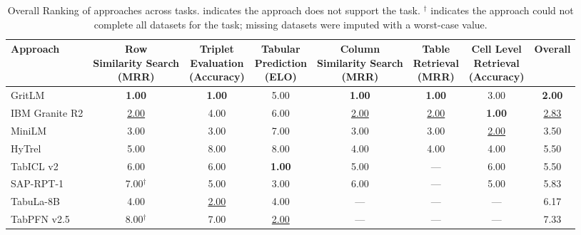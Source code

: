 \begin{table}[t]
\centering
\begin{tabular*}{\textwidth}{lccccccc}
\hline
Approach & \makecell{Row \\ Similarity Search \\ (MRR)} & \makecell{Triplet \\ Evaluation \\ (Accuracy) } & \makecell{Tabular \\ Prediction\\ (ELO)} & \makecell{Column \\ Similarity Search \\ (MRR)} & \makecell{Table \\ Retrieval \\ (MRR)} & \makecell{Cell Level\\ Retrieval \\ (Accuracy)} & Overall \\
\hline
GritLM & \textbf{1.00} & \textbf{1.00} & 5.00 & \textbf{1.00} & \textbf{1.00} & 3.00 & \textbf{2.00} \\
IBM Granite R2 & \underline{2.00} & 4.00 & 6.00 & \underline{2.00} & \underline{2.00} & \textbf{1.00} & \underline{2.83} \\
MiniLM & 3.00 & 3.00 & 7.00 & 3.00 & 3.00 & \underline{2.00} & 3.50 \\
HyTrel & 5.00 & 8.00 & 8.00 & 4.00 & 4.00 & 4.00 & 5.50 \\
TabICL v2 & 6.00 & 6.00 & \textbf{1.00} & 5.00 & --- & 6.00 & 5.50 \\
SAP-RPT-1 & 7.00$^\dagger$ & 5.00 & 3.00 & 6.00 & --- & 5.00 & 5.83 \\
TabuLa-8B & 4.00 & \underline{2.00} & 4.00 & --- & --- & --- & 6.17 \\
TabPFN v2.5 & 8.00$^\dagger$ & 7.00 & \underline{2.00} & --- & --- & --- & 7.33 \\
\hline
\end{tabular*}
\caption{Overall Ranking of approaches across tasks. \text{---} indicates the approach does not support the task. $^\dagger$ indicates the approach could not complete all datasets for the task; missing datasets were imputed with a worst-case value.}
\label{tab:overall_ranking}
\end{table}
